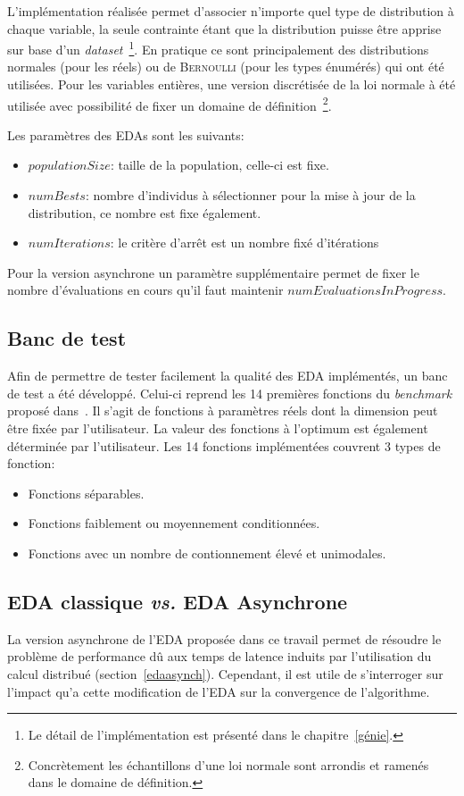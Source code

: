 \documentclass[a4paper, 11pt]{report}
\begin{document}
L'implémentation réalisée permet d'associer n'importe quel type de distribution à chaque variable, la seule contrainte étant que la distribution puisse être apprise sur base d'un \textit{dataset}~\footnote{Le détail de l'implémentation est présenté dans le chapitre~\ref{génie}.}. En pratique ce sont principalement des distributions normales (pour les réels) ou de \textsc{Bernoulli} (pour les types énumérés) qui ont été utilisées. Pour les variables entières, une version discrétisée de la loi normale à été utilisée avec possibilité de fixer un domaine de définition~\footnote{Concrètement les échantillons d'une loi normale sont arrondis et ramenés dans le domaine de définition.}.

Les paramètres des EDAs sont les suivants:
\begin{itemize}
\item $populationSize$: taille de la population, celle-ci est fixe.
\item $numBests$: nombre d'individus à sélectionner pour la mise à jour de la distribution, ce nombre est fixe également.
\item $numIterations$: le critère d'arrêt est un nombre fixé d'itérations
\end{itemize}    
Pour la version asynchrone un paramètre supplémentaire permet de fixer le nombre d'évaluations en cours qu'il faut maintenir $numEvaluationsInProgress$.

\subsection{Banc de test}
Afin de permettre de tester facilement la qualité des EDA implémentés, un banc de test a été développé. Celui-ci reprend les 14 premières fonctions du \textit{benchmark} proposé dans~\cite{TESTBED}. Il s'agit de fonctions à paramètres réels dont la dimension peut être fixée par l'utilisateur. La valeur des fonctions à l'optimum est également déterminée par l'utilisateur. Les 14 fonctions implémentées couvrent 3 types de fonction:
\begin{itemize}
\item Fonctions séparables.
\item Fonctions faiblement ou moyennement conditionnées.
\item Fonctions avec un nombre de contionnement élevé et unimodales. %
\end{itemize}

\subsection{EDA classique \textit{vs.} EDA Asynchrone}
\label{edavsasync}
La version asynchrone de l'EDA proposée dans ce travail permet de résoudre le problème de performance dû aux temps de latence induits par l'utilisation du calcul distribué (section~\ref{edaasynch}). Cependant, il est utile de s'interroger sur l'impact qu'a cette modification de l'EDA sur la convergence de l'algorithme.
\end{document}
